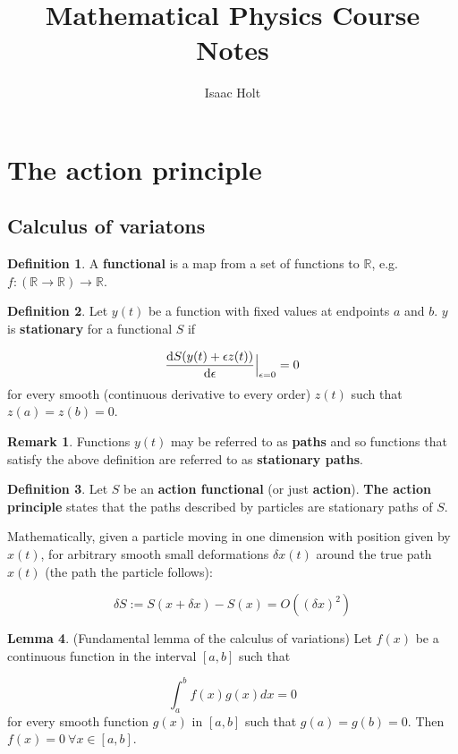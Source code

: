 \documentclass[12pt,a4paper]{article}
\title{Mathematical Physics Course Notes}
\author{Isaac Holt}
\theoremstyle{definition}
\newtheorem{definition}{Definition}[subsection]
\newtheorem{lemma}[definition]{Lemma}
\newtheorem*{remark}{Remark}
\let\oldforall\forall
\renewcommand{\forall}{\ \oldforall}
\begin{document}
\maketitle

\section{The action principle}

\subsection{Calculus of variatons}

\begin{definition}
	A \textbf{functional} is a map from a set of functions to $\mathbb{R}$, e.g. $f: (\mathbb{R} \rightarrow \mathbb{R}) \rightarrow \mathbb{R}$.
\end{definition}

\begin{definition}
	Let $y(t)$ be a function with fixed values at endpoints $a$ and $b$. $y$ is \textbf{stationary} for a functional $S$ if

	\[ \diff{S (y(t) + \epsilon z(t))}{\epsilon}\Big|_{\epsilon = 0} = 0 \]
	for every smooth (continuous derivative to every order) $z(t)$ such that $z(a) = z(b) = 0$.
\end{definition}

\begin{remark}
	Functions $y(t)$ may be referred to as \textbf{paths} and so functions that satisfy the above definition are referred to as \textbf{stationary paths}.
\end{remark}

\begin{definition}
	Let $S$ be an \textbf{action functional} (or just \textbf{action}). \textbf{The action principle} states that the paths described by particles are stationary paths of $S$.

	Mathematically, given a particle moving in one dimension with position given by $x(t)$, for arbitrary smooth small deformations $\delta x(t)$ around the true path $x(t)$ (the path the particle follows):

	\[ \delta S := S(x + \delta x) - S(x) = O((\delta x)^2) \]
\end{definition}

\begin{lemma}
	(Fundamental lemma of the calculus of variations) Let $f(x)$ be a continuous function in the interval $[a, b]$ such that

	\[ \int_a^b f(x) g(x) dx = 0 \]
	for every smooth function $g(x)$ in $[a, b]$ such that $g(a) = g(b) = 0$. Then $f(x) = 0 \forall x \in [a, b]$.
\end{lemma}
\end{document}
